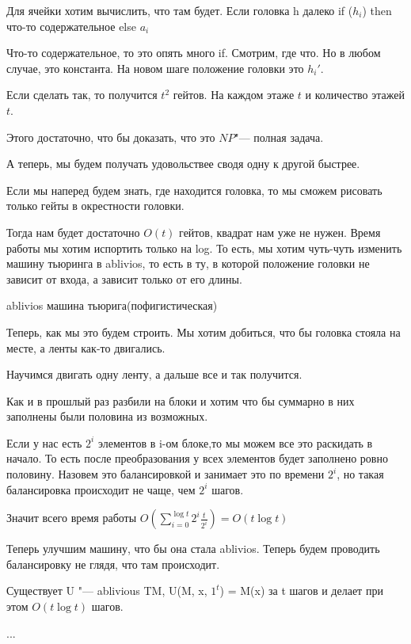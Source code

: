 Для ячейки хотим вычислить, что там будет. Если головка h далеко
if ($h_i$) then что-то содержательное
else $a_i$

Что-то содержательное, то это опять много if. Смотрим, где что. Но 
в любом случае, это константа. 
На новом шаге положение головки это $h_i'$.

Если сделать так, то получится $t^2$ гейтов. На каждом этаже $t$ и 
количество этажей $t$.

Этого достаточно, что бы доказать, что это $NP$"--- полная задача. 

А теперь, мы будем получать удовольствее сводя одну к другой быстрее.

Если мы наперед будем знать, где находится головка, то мы сможем рисовать
только гейты в окрестности головки.

Тогда нам будет достаточно $O(t)$ гейтов, квадрат нам уже не нужен. 
Время работы мы хотим испортить только на log.  То есть,
мы хотим чуть-чуть изменить машину тьюринга в ablivios, то 
есть в ту, в которой положение головки не зависит от входа,
а зависит только от его длины. 

ablivios машина тьюрига(пофигистическая)

Теперь, как мы это будем строить. 
Мы хотим добиться, что бы головка стояла на месте, а ленты как-то двигались. 

Научимся двигать одну ленту, а дальше все и так получится. 

Как и в прошлый раз разбили на блоки и хотим что бы суммарно в них заполнены были половина из 
возможных. 

Если у нас есть $2^i$ элементов в i-ом блоке,то мы можем все это раскидать в начало. 
То есть после преобразования у всех элементов будет заполнено ровно половину. Назовем это
балансировкой и занимает это по времени $2^i$, но такая балансировка происходит 
не чаще, чем $2^i$ шагов. 

Значит всего время работы $O(\sum_{i = 0}^{\log t}2^i \frac{t}{2^i}) = O(t\log t)$

Теперь улучшим машину, что бы она стала ablivios. Теперь будем проводить 
балансировку не глядя, что там происходит. 

\begin{lemma}
Существует U "--- ablivious TM, U(M, x, $1^t$) = M(x) за t шагов и 
делает при этом $O(t\log t)$ шагов. 
\end{lemma}
\begin{conseq}
...
\end{conseq}


